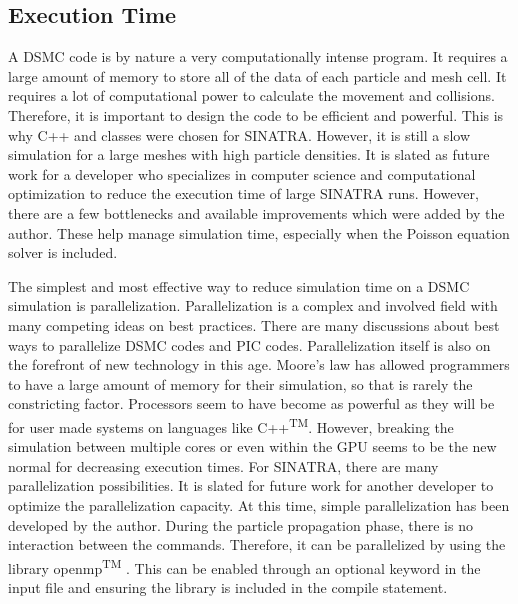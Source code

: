 \subsection{Execution Time} %
A DSMC code is by nature a very computationally intense program. It requires a large amount of memory to store all of the data of each particle and mesh cell. It requires a lot of computational power to calculate the movement and collisions. Therefore, it is important to design the code to be efficient and powerful. This is why C++ and classes were chosen for SINATRA. However, it is still a slow simulation for a large meshes with high particle densities. It is slated as future work for a developer who specializes in computer science and computational optimization to reduce the execution time of large SINATRA runs. However, there are a few bottlenecks and available improvements which were added by the author. These help manage simulation time, especially when the Poisson equation solver is included.\par

\indent The simplest and most effective way to reduce simulation time on a DSMC simulation is parallelization. Parallelization is a complex and involved field with many competing ideas on best practices. There are many discussions about best ways to parallelize DSMC codes and PIC codes. Parallelization itself is also on the forefront of new technology in this age. Moore's law has allowed programmers to have a large amount of memory for their simulation, so that is rarely the constricting factor. Processors seem to have become as powerful as they will be for user made systems on languages like C++\textsuperscript{TM}. However, breaking the simulation between multiple cores or even within the GPU seems to be the new normal for decreasing execution times. For SINATRA, there are many parallelization possibilities. It is slated for future work for another developer to optimize the parallelization capacity. At this time, simple parallelization has been developed by the author. During the particle propagation phase, there is no interaction between the commands. Therefore, it can be parallelized by using the library openmp\textsuperscript{TM} \cite{openmp}. This can be enabled through an optional keyword in the input file and ensuring the library is included in the compile statement. \par

